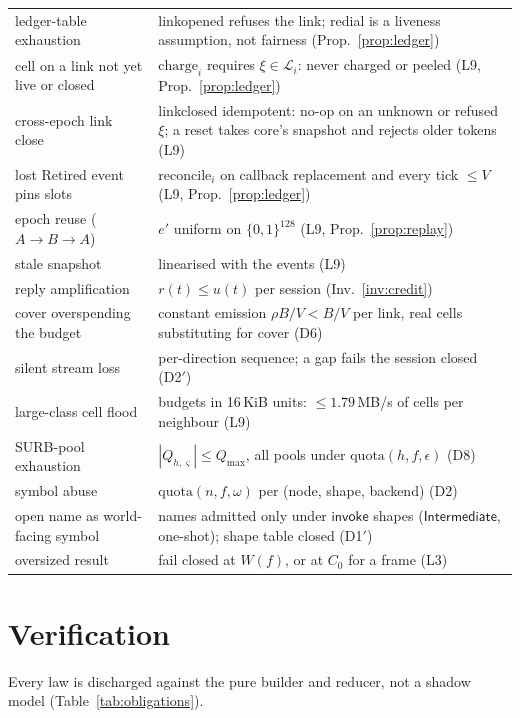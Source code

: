 \documentclass[journal]{IEEEtran}
\newcommand{\Int}{\mathsf{Intermediate}}
\newcommand{\quota}{\mathrm{quota}}
\newcommand{\sid}{\varsigma}
\DeclareRobustCommand{\code}[1]{{\ttfamily\renewcommand{\_}{\textunderscore\allowbreak}#1}}
\begin{document}
\begin{table}[t]
\begin{tabular}{@{}>{\raggedright\arraybackslash}p{}>{\raggedright\arraybackslash}p{}@{}}
ledger-table exhaustion & \code{link\_opened} refuses the link; redial is a liveness assumption, not fairness (Prop.~\ref{prop:ledger}) \\
cell on a link not yet live or closed & $\mathrm{charge}_i$ requires $\xi\in\mathcal L_i$: never charged or peeled (L9, Prop.~\ref{prop:ledger}) \\
cross-epoch link close & \code{link\_closed} idempotent: no-op on an unknown or refused $\xi$; a reset takes core's snapshot and rejects older tokens (L9) \\
lost \code{Retired} event pins slots & $\mathrm{reconcile}_i$ on callback replacement and every tick $\le V$ (L9, Prop.~\ref{prop:ledger}) \\
epoch reuse ($A\to B\to A$) & $e'$ uniform on $\{0,1\}^{128}$ (L9, Prop.~\ref{prop:replay}) \\
stale snapshot & linearised with the events (L9) \\
reply amplification & $r(t)\le u(t)$ per session (Inv.~\ref{inv:credit}) \\
cover overspending the budget & constant emission $\rho B/V<B/V$ per link, real cells substituting for cover (D6) \\
silent stream loss & per-direction sequence; a gap fails the session closed (D2$'$) \\
large-class cell flood & budgets in 16\,KiB units: $\le1.79$\,MB/s of cells per neighbour (L9) \\
SURB-pool exhaustion & $|Q_{h,\sid}|\le Q_{\max}$, all pools under $\quota(h,f,\epsilon)$ (D8) \\
symbol abuse & $\quota(n,f,\omega)$ per (node, shape, backend) (D2) \\
open name as world-facing symbol & names admitted only under $\mathsf{invoke}$ shapes ($\Int$, one-shot); shape table closed (D1$'$) \\
oversized result & fail closed at $W(f)$, or at $C_0$ for a frame (L3) \\
\bottomrule
\end{tabular}
\end{table}

\section{Verification}\label{sec:verification}

Every law is discharged against the pure builder and reducer, not a shadow
model (Table~\ref{tab:obligations}).
\end{document}

